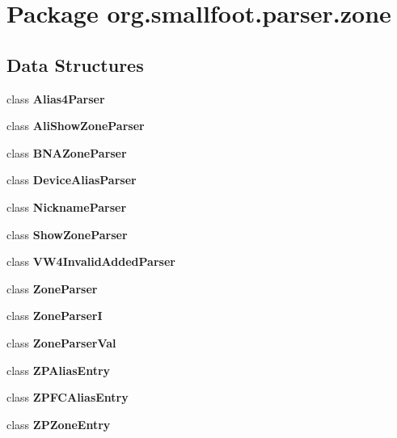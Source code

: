 \section{Package org.\+smallfoot.\+parser.\+zone}
\label{namespaceorg_1_1smallfoot_1_1parser_1_1zone}
\subsection*{Data Structures}
\begin{DoxyCompactItemize}
\item 
class {\bf Alias4\+Parser}
\item 
class {\bf Ali\+Show\+Zone\+Parser}
\item 
class {\bf B\+N\+A\+Zone\+Parser}
\item 
class {\bf Device\+Alias\+Parser}
\item 
class {\bf Nickname\+Parser}
\item 
class {\bf Show\+Zone\+Parser}
\item 
class {\bf V\+W4\+Invalid\+Added\+Parser}
\item 
class {\bf Zone\+Parser}
\item 
class {\bf Zone\+Parser\+I}
\item 
class {\bf Zone\+Parser\+Val}
\item 
class {\bf Z\+P\+Alias\+Entry}
\item 
class {\bf Z\+P\+F\+C\+Alias\+Entry}
\item 
class {\bfseries Z\+P\+Zone\+Entry}
\end{DoxyCompactItemize}
